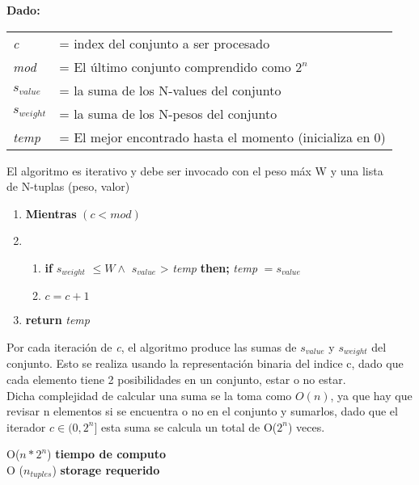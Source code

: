 \documentclass[fleqn, 11pt]{article}
\begin{document}
\textbf{Dado:}

\begin{tabular}{l l}
    \textit{c} & = index del conjunto a ser procesado \\
    \textit{mod} & = El último conjunto comprendido como $2^n$ \\
    \textit{$s_{value}$} & = la suma de los N-values del conjunto \\
    \textit{$s_{weight}$} & = la suma de los N-pesos del conjunto \\
    \textit{temp} & = El mejor encontrado hasta el momento (inicializa en 0) \\
\end{tabular}


El algoritmo es iterativo y debe ser invocado con el peso máx W  y una lista \\ de N-tuplas (peso, valor)

\begin{enumerate}
	\item \textbf{Mientras} $(c < mod)$

	\item   \begin{enumerate}
	             \item \textbf{if} \quad \textit{$s_{weight}$} $\le  W \land$ \textit{$s_{value}$}  > \textit{temp}  \quad \textbf{then; } \textit{temp} $ = s_{value} $
	             \item $c = c + 1$
	        \end{enumerate}

    \item \textbf{return} \textit{temp}
\end{enumerate}



Por cada iteración de \textit{c}, el algoritmo produce las sumas de \textit{$s_{value}$} y \textit{$s_{weight}$} del conjunto. Esto se realiza usando la representación binaria del indice c, dado que cada elemento tiene 2 posibilidades en un conjunto, estar o no estar. \\

Dicha complejidad de calcular una suma se la toma como $O(n)$, ya que hay que revisar n elementos si se encuentra o no en el conjunto y sumarlos, dado que el iterador $c \in (0,2^n]$ esta suma se calcula un total de O($2^n$) veces.

\small O($n * 2^n$) \textbf{ tiempo de computo}  \\
\small O ($n_{tuples}$) \textbf{ storage requerido} \\
\end{document}

